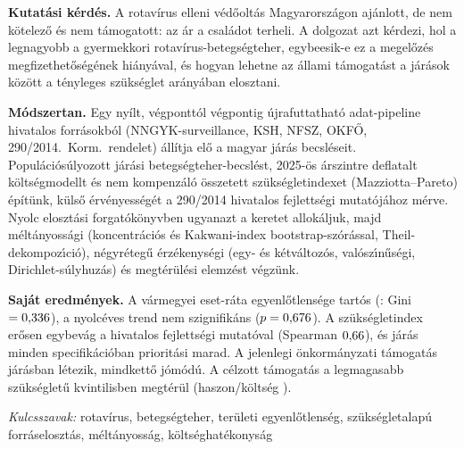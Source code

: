 \documentclass[12pt,a4paper]{article}
\begin{document}
\tdkfrontmatter
\tdkborito

\begin{tdkabsztrakt}
\textbf{Kutat\'asi k\'erd\'es.} A rotav\'irus elleni v\'ed\H{o}olt\'as Magyarorsz\'agon
aj\'anlott, de nem k\"otelez\H{o} \'es nem t\'amogatott: az \'ar a csal\'adot terheli.
A dolgozat azt k\'erdezi, hol a legnagyobb a gyermekkori
rotav\'irus-betegs\'egteher, egybeesik-e ez a megel\H{o}z\'es megfizethet\H{o}s\'eg\'enek
hi\'any\'aval, \'es hogyan lehetne az \'allami t\'amogat\'ast a j\'ar\'asok k\"oz\"ott a
t\'enyleges sz\"uks\'eglet ar\'any\'aban elosztani.

\textbf{M\'odszertan.} Egy ny\'ilt, v\'egpontt\'ol v\'egpontig \'ujrafuttathat\'o
adat-pipeline hivatalos forr\'asokb\'ol (NNGYK-surveillance, KSH, NFSZ, OKF\H{O},
290/2014.~Korm.~rendelet) \'all\'itja el\H{o} a \nDistricts{} magyar j\'ar\'as
becsl\'eseit. Popul\'aci\'os\'ulyozott j\'ar\'asi betegs\'egteher-becsl\'est,
2025-\"os \'arszintre deflatalt k\"olts\'egmodellt \'es nem kompenz\'al\'o
\"osszetett sz\"uks\'egletindexet (Mazziotta--Pareto) \'ep\'it\"unk, k\"uls\H{o}
\'erv\'enyess\'eg\'et a 290/2014 hivatalos fejletts\'egi mutat\'oj\'ahoz m\'erve.
Nyolc eloszt\'asi forgat\'ok\"onyvben ugyanazt a keretet allok\'aljuk, majd
m\'elt\'anyoss\'agi (koncentr\'aci\'os \'es Kakwani-index bootstrap-sz\'or\'assal,
Theil-dekompoz\'\i{}ci\'o), n\'egyr\'eteg\H{u} \'erz\'ekenys\'egi (egy- \'es k\'etv\'altoz\'os,
val\'osz\'\i{}n\H{u}s\'egi, Dirichlet-s\'ulyhuz\'as) \'es megt\'er\"ul\'esi elemz\'est v\'egz\"unk.

\textbf{Saj\'at eredm\'enyek.} A v\'armegyei eset-r\'ata egyenl\H{o}tlens\'ege tart\'os
(\csYear: Gini $=0{,}336$), a nyol\-c\'eves trend nem szignifik\'ans
($p=0{,}676$). A sz\"uks\'egletindex er\H{o}sen egybev\'ag a hivatalos
fejletts\'egi mutat\'oval (Spearman $0{,}66$), \'es
\nSpecRobust{} j\'ar\'as minden specifik\'aci\'oban priorit\'asi marad. A jelenlegi
\"onkorm\'anyzati t\'amogat\'as \nDistrictsMuni{} j\'ar\'asban l\'etezik, mindkett\H{o}
j\'om\'od\'u. A c\'elzott t\'amogat\'as a legmagasabb sz\"uks\'eglet\H{u} kvintilisben
megt\'er\"ul (haszon/k\"olts\'eg \ceBcrTopNeed).

\medskip
\noindent\emph{Kulcsszavak:} rotav\'irus, betegs\'egteher, ter\"uleti
egyenl\H{o}tlens\'eg, sz\"uks\'egletalap\'u forr\'aseloszt\'as, m\'elt\'anyoss\'ag,
k\"olts\'eghat\'ekonys\'ag
\end{tdkabsztrakt}
\end{document}
